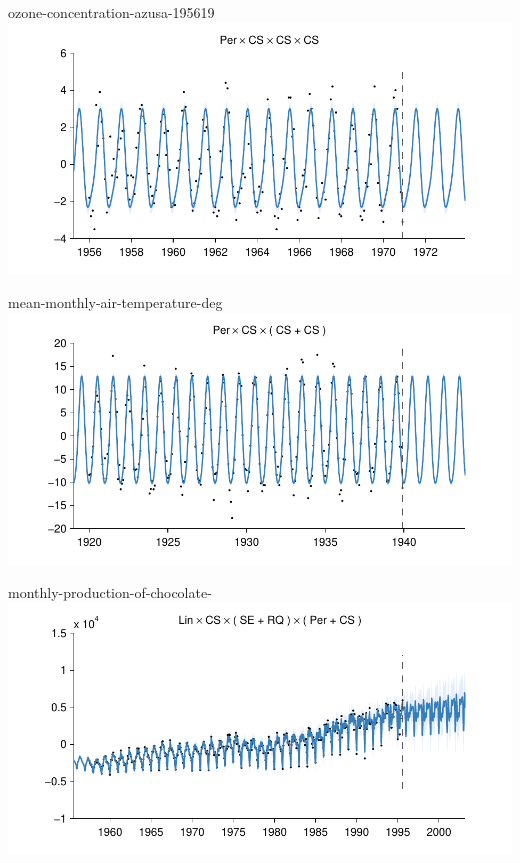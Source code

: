 \begin{frame}{ozone-concentration-azusa-195619}
  \center
  \includegraphics[width=1.0\textwidth]{figures/ozone-concentration-azusa-195619/ozone-concentration-azusa-195619_all}
\end{frame}  

\begin{frame}{mean-monthly-air-temperature-deg}
  \center
  \includegraphics[width=1.0\textwidth]{figures/mean-monthly-air-temperature-deg/mean-monthly-air-temperature-deg_all}
\end{frame}

\begin{frame}{monthly-production-of-chocolate-}
  \center
  \includegraphics[width=1.0\textwidth]{figures/monthly-production-of-chocolate-/monthly-production-of-chocolate-_all}
\end{frame}

